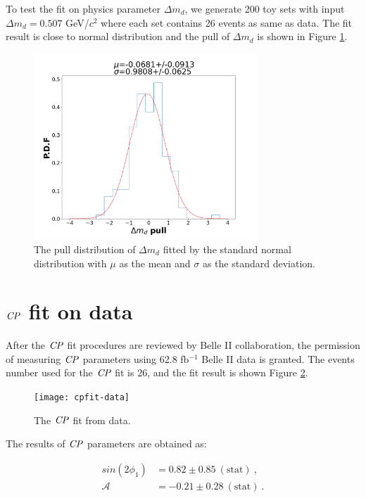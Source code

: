 To test the fit on physics parameter $\Delta m_d$, we generate 200 toy sets with input $\Delta m_d = 0.507 $ GeV/$c^2$ where each set contains 26 events as same as data. The fit result is close to normal distribution and the pull of $\Delta m_d$ is shown in Figure \ref{fig:cpfit_dm_pull}. 
\begin{figure}[htpb]
	\centering
	\includegraphics[height=7cm]{figures/pull_hist_dm}
	\caption{The pull distribution of $\Delta m_d$ fitted by the standard normal distribution with $\mu$ as the mean and $\sigma$ as the standard deviation. }
	\label{fig:cpfit_dm_pull}
\end{figure}

\section{$\it{CP}$ fit on data}
After the $\it{CP}$ fit procedures are reviewed by Belle II collaboration, the permission of measuring $\it{CP}$ parameters using 62.8 fb$^{-1}$ Belle II data is granted. The events number used for the $\it{CP}$ fit is 26, and the fit result is shown Figure \ref{fig:cpfit_data}.

\begin{figure}[H]
	\centering
	\texttt{[image: cpfit-data]}
	\caption{The $\it{CP}$ fit from data.}
	\label{fig:cpfit_data}
\end{figure}

The results of $\it{CP}$ parameters are obtained as:

\begin{equation}
\begin{split}
sin(2\phi_1) & = 0.82 \pm 0.85~(\text{stat})~, \\
\mathcal{A} & = -0.21 \pm 0.28~(\text{stat})~. \\
\end{split}
\end{equation} 

